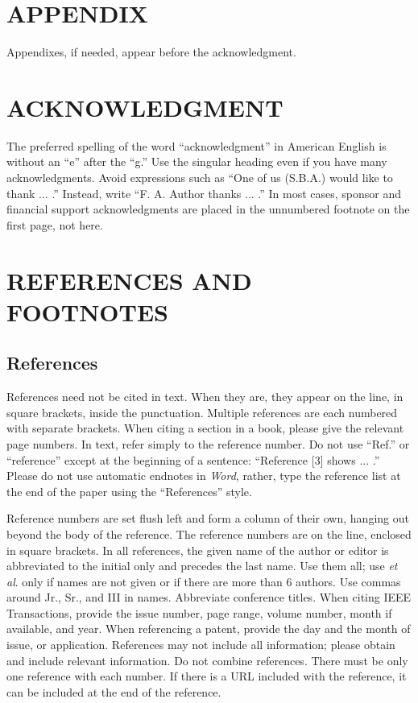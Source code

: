 \documentclass[correspondence]{IEEEtaes}
\begin{document}
\section*{APPENDIX}

Appendixes, if needed, appear before the acknowledgment.

\section*{ACKNOWLEDGMENT}

The preferred spelling of the word ``acknowledgment'' in American English is without an ``e'' after the ``g.'' Use the singular heading even if you have many acknowledgments. Avoid expressions such as ``One of us (S.B.A.) would like to thank ... .'' Instead, write ``F. A. Author thanks ... .'' In most cases, sponsor and financial support acknowledgments are placed in the unnumbered footnote on the first page, not here.

\section*{REFERENCES AND FOOTNOTES}

\subsection{References}

References need not be cited in text. When they are, they appear on the line, in square brackets, inside the punctuation. Multiple references are each numbered with separate brackets. When citing a section in a book, please give the relevant page numbers. In text, refer simply to the reference number. Do not use ``Ref.'' or ``reference'' except at the beginning of a sentence: ``Reference {[}3{]} shows ... .'' Please do not use automatic endnotes in \emph{Word}, rather, type the reference list at the end of the paper using the ``References'' style.

Reference numbers are set flush left and form a column of their own, hanging out beyond the body of the reference. The reference numbers are on the line, enclosed in square brackets. In all references, the given name of the author or editor is abbreviated to the initial only and precedes the last name. Use them all; use \emph{et al}. only if names are not given or if there are more than 6 authors. Use commas around Jr., Sr., and III in names. Abbreviate conference titles. When citing IEEE Transactions, provide the issue number, page range, volume number, month if available, and year. When referencing a patent, provide the day and the month of issue, or application. References may not include all information; please obtain and include relevant information. Do not combine references. There must be only one reference with each number. If there is a URL included with the reference, it can be included at the end of the reference.
\end{document}

